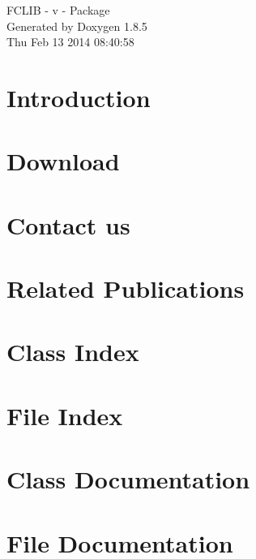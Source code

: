 \documentclass[twoside]{article}
\begin{document}
\hypersetup{pageanchor=false}
\begin{titlepage}
\vspace*{7cm}
\begin{center}%
{\Large F\-C\-L\-I\-B -\/ v -\/ Package }\\
\vspace*{1cm}
{\large Generated by Doxygen 1.8.5}\\
\vspace*{0.5cm}
{\small Thu Feb 13 2014 08:40:58}\\
\end{center}
\end{titlepage}
\tableofcontents
{}
\hypersetup{pageanchor=true}

\section{Introduction}
\label{index}\hypertarget{index}{}
\section{Download}
\label{download}
\hypertarget{download}{}

\section{Contact us}
\label{contact}
\hypertarget{contact}{}

\section{Related Publications}
\label{publications}
\hypertarget{publications}{}

\section{Class Index}

\section{File Index}

\section{Class Documentation}










\section{File Documentation}











\newpage
{}
{}
\printindex
\end{document}

